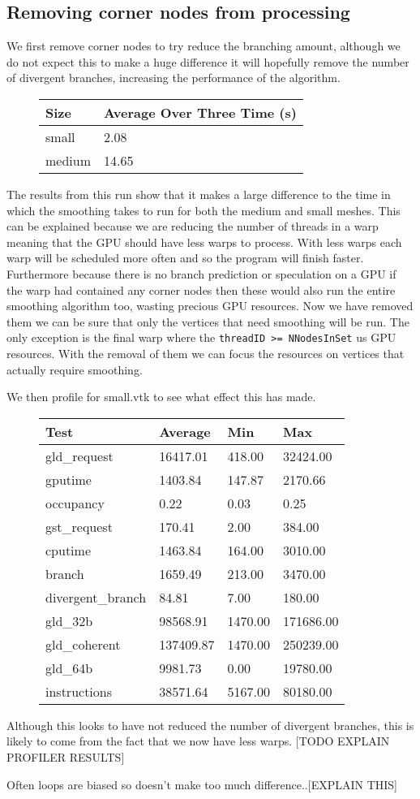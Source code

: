 \subsection{Removing corner nodes from processing}
We first remove corner nodes to try reduce the branching amount, although we do not expect this to make a huge difference it will hopefully remove the number of divergent branches, increasing the performance of the algorithm. \\
\begin{figure}[H]\centering \begin{tabular}{ l | l }
  \hline
  Size & Average Over Three Time (s)\\
  \hline
  \hline
  small & 2.08 \\
  medium & 14.65 \\
  \hline
\end{tabular} \end{figure}

The results from this run show that it makes a large difference to the time in which the smoothing takes to run for both the medium and small meshes. This can be explained because we are reducing the number of threads in a warp meaning that the GPU should have less warps to process. With less warps each warp will be scheduled more often and so the program will finish faster. Furthermore because there is no branch prediction or speculation on a GPU if the warp had contained any corner nodes then these would also run the entire smoothing algorithm too, wasting precious GPU resources. Now we have removed them we can be sure that only the vertices that need smoothing will be run.
The only exception is the final warp where the \verb!threadID >= NNodesInSet!
us GPU resources.
With the removal of them we can focus the resources on vertices that actually require smoothing.

We then profile for small.vtk to see what effect this has made.\\
\begin{figure}[H]\centering \begin{tabular}{ l | l | l | l}
\hline
Test & Average & Min & Max \\
\hline
\hline
gld\_request & 16417.01 & 418.00 & 32424.00 \\
gputime & 1403.84 & 147.87 & 2170.66 \\
occupancy & 0.22 & 0.03 & 0.25 \\
gst\_request & 170.41 & 2.00 & 384.00 \\
cputime & 1463.84 & 164.00 & 3010.00 \\
branch & 1659.49 & 213.00 & 3470.00 \\
divergent\_branch & 84.81 & 7.00 & 180.00 \\
gld\_32b & 98568.91 & 1470.00 & 171686.00 \\
gld\_coherent & 137409.87 & 1470.00 & 250239.00 \\
gld\_64b & 9981.73 & 0.00 & 19780.00 \\
instructions & 38571.64 & 5167.00 & 80180.00 \\
\hline
\end{tabular} \end{figure}

Although this looks to have not reduced the number of divergent branches, this is likely to come from the fact that we now have less warps. [TODO EXPLAIN PROFILER RESULTS]

Often loops are biased so doesn't make too much difference..[EXPLAIN THIS]
